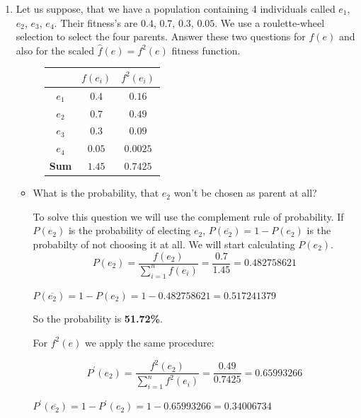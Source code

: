\documentclass[12pt,english]{article}
\newenvironment{statement}{\fontfamily{ptm}\selectfont}{\par}
\begin{document}
\begin{enumerate}
	\item
		\begin{statement}
			Let us suppose, that we have a population containing 4 individuals called $e_1$, $e_2$, $e_3$, $e_4$. Their fitness’s are $0.4$, $0.7$, $0.3$, $0.05$. We use a roulette-wheel selection to select the four parents. Answer these two questions for $f(e)$ and also for the scaled $\hat{f}(e)=f^2(e)$ fitness function.
		\end{statement}
	\begin{figure}[H]
		\centering
		\begin{tabular}{|c|c|c|}
			\hline
		 	& $f(e_i)$ & $f^{2}(e_i)$ \\
		 	\hline
			$e_1$ & $0.4$ & $0.16$ \\
			\hline
			$e_2$ & $0.7$ & $0.49$ \\
			\hline
			$e_3$ & $0.3$ & $0.09$ \\
			\hline
			$e_4$ & $0.05$ & $0.0025$ \\
			\hline
			\textbf{Sum} & $1.45$ & $0.7425$ \\
			\hline
		\end{tabular}
	\end{figure}
	\begin{itemize}
		\item
		\begin{statement}
			What is the probability, that $e_2$ won’t be chosen as parent at all?
		\end{statement}

			To solve this question we will use the complement rule of probability. If $P(e_2)$ is the probability of electing $e_2$, $P(\overline{e_2}) = 1 - P(e_2)$ is the probabilty of not choosing it at all. We will start calculating $P(e_2)$.
			\[
				P(e_2) = \frac{f(e_2)}{\sum_{i=1}^{n}{f(e_i)}} = \frac{0.7}{1.45} = 0.482758621
			\]
			\begin{center}
			$P(\overline{e_2}) = 1 - P(e_2) = 1 - 0.482758621 = 0.517241379 $\\
			\end{center}

			So the probability is \textbf{51.72\%}.

			For $f^2(e)$ we apply the same procedure:

			\[
				P^{\prime}(e_2) = \frac{f^{2}(e_2)}{\sum_{i=1}^{n}{f^{2}(e_i)}} = \frac{0.49}{0.7425} = 0.65993266
			\]
			\begin{center}
			$P^{\prime}(\overline{e_2}) = 1 - P^{\prime}(e_2) = 1 - 0.65993266 = 0.34006734 $\\
			\end{center}


\end{itemize}
\end{enumerate}
\end{document}
